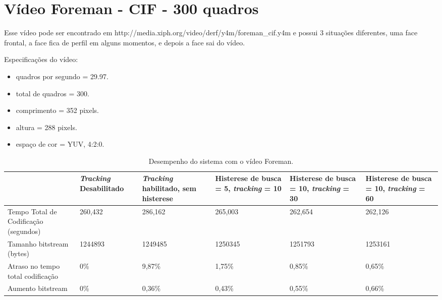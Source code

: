 \section{ Vídeo Foreman - CIF - 300 quadros }


Esse vídeo pode ser encontrado em http://media.xiph.org/video/derf/y4m/foreman\_cif.y4m e possui 3 situações diferentes, uma face frontal, a face fica de perfil em alguns momentos, e depois a face sai do vídeo.


Especificações do vídeo:

\begin{itemize}
        \item quadros por segundo = 29.97.
        \item total de quadros    = 300.
        \item comprimento         = 352 pixels.
        \item altura              = 288 pixels.
        \item espaço de cor       = YUV, 4:2:0.
\end{itemize}


\begin{table}[H]
\begin{center}
\begin{tabular}{|p{2.3cm}|p{2.3cm}|p{2.3cm}|p{2.3cm}|p{2.3cm}|p{2.3cm}|}
\hline
\textbf{} & \textbf{\textit{Tracking} Desabilitado} & \textbf{\textit{Tracking} habilitado, sem histerese} & \textbf{Histerese de busca = 5, \textit{tracking} = 10} & \textbf{Histerese de busca = 10, \textit{tracking} = 30} & \textbf{Histerese de busca = 10, \textit{tracking} = 60} \\
\hline
Tempo Total de Codificação (segundos) & 260,432 & 286,162 & 265,003 & 262,654 & 262,126 \\
\hline
Tamanho bitstream (bytes) & 1244893 & 1249485 & 1250345 & 1251793 & 1253161 \\
\hline
Atraso no tempo total codificação & 0\% & 9,87\% & 1,75\% & 0,85\% & 0,65\% \\
\hline
Aumento bitstream  & 0\% & 0,36\% & 0,43\% & 0,55\% & 0,66\% \\
\hline
\end{tabular}
\caption{Desempenho do sistema com o vídeo Foreman.}
\label{tab:space_overhead}
\end{center}
\end{table}

